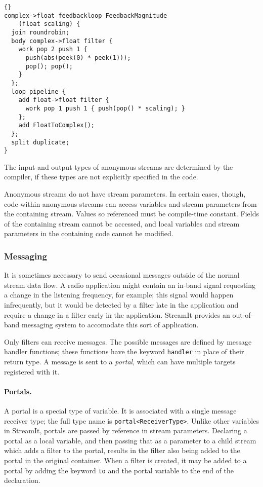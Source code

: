 \documentclass[11pt]{article}
\begin{document}
\begin{lstlisting}{}
complex->float feedbackloop FeedbackMagnitude
    (float scaling) {
  join roundrobin;
  body complex->float filter {
    work pop 2 push 1 {
      push(abs(peek(0) * peek(1)));
      pop(); pop();
    }
  };
  loop pipeline {
    add float->float filter {
      work pop 1 push 1 { push(pop() * scaling); }
    };
    add FloatToComplex();
  };
  split duplicate;
}
\end{lstlisting}

The input and output types of anonymous streams are determined by the
compiler, if these types are not explicitly specified in the code.

Anonymous streams do not have stream parameters.  In certain cases,
though, code within anonymous streams can access variables and stream
parameters from the containing stream.  Values so referenced must be
compile-time constant.  Fields of the containing stream cannot be
accessed, and local variables and stream parameters in the containing
code cannot be modified.

\subsubsection{Messaging}
\label{sec:messaging}

It is sometimes necessary to send occasional messages outside of the
normal stream data flow.  A radio application might contain an in-band
signal requesting a change in the listening frequency, for example;
this signal would happen infrequently, but it would be detected by a
filter late in the application and require a change in a filter early
in the application.  StreamIt provides an out-of-band messaging system
to accomodate this sort of application.

Only filters can receive messages.  The possible messages are defined
by message handler functions; these functions have the keyword
\lstinline|handler| in place of their return type.  A message is sent
to a \emph{portal}, which can have multiple targets registered with
it.

\paragraph{Portals.}  A portal is a special type of variable.  It is
associated with a single message receiver type; the full type name is
\lstinline|portal<ReceiverType>|.  Unlike other variables in StreamIt,
portals are passed by reference in stream parameters.  Declaring a
portal as a local variable, and then passing that as a parameter to a
child stream which adds a filter to the portal, results in the filter
also being added to the portal in the original container.
When a filter is created, it may be added to a portal by adding the
keyword \lstinline|to| and the portal variable to the end of the
declaration.
\end{document}
